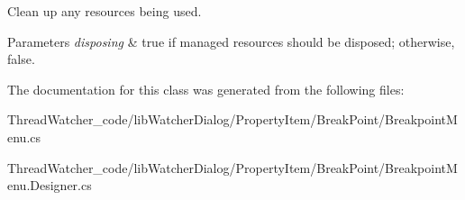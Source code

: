 Clean up any resources being used. 


\begin{DoxyParams}{Parameters}
{\em disposing} & true if managed resources should be disposed; otherwise, false.\\
\hline
\end{DoxyParams}


The documentation for this class was generated from the following files\+:\begin{DoxyCompactItemize}
\item 
Thread\+Watcher\+\_\+code/lib\+Watcher\+Dialog/\+Property\+Item/\+Break\+Point/Breakpoint\+Menu.\+cs\item 
Thread\+Watcher\+\_\+code/lib\+Watcher\+Dialog/\+Property\+Item/\+Break\+Point/Breakpoint\+Menu.\+Designer.\+cs\end{DoxyCompactItemize}

